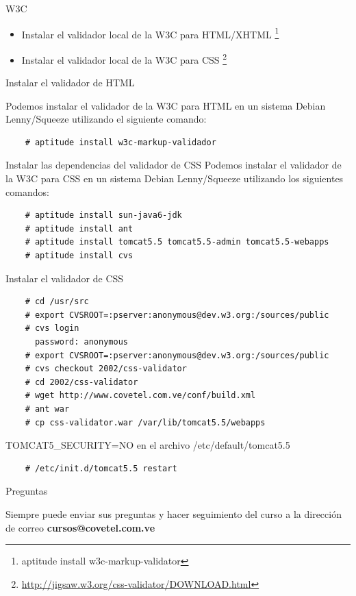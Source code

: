 \documentclass{beamer}
\begin{document}
\begin{frame}{W3C} %
    \begin{center}
    \begin{itemize}
        \item Instalar el validador local de la W3C para HTML/XHTML
        \footnote{aptitude install w3c-markup-validator} 
        \item Instalar el validador local de la W3C para CSS \footnote{\url{http://jigsaw.w3.org/css-validator/DOWNLOAD.html}}
    \end{itemize}
    \end{center}
\end{frame}

\begin{frame}[fragile]{Instalar el validador de HTML} %
    \begin{center}
    Podemos instalar el validador de la W3C para HTML en un sistema Debian
    Lenny/Squeeze utilizando el siguiente comando:
    \begin{verbatim}
    # aptitude install w3c-markup-validador
    \end{verbatim}
    \end{center}
\end{frame}

\begin{frame}[fragile]{Instalar las dependencias del validador de CSS} %
    Podemos instalar el validador de la W3C para CSS en un sistema Debian
    Lenny/Squeeze utilizando los siguientes comandos:
    {\footnotesize
    \begin{verbatim}
    # aptitude install sun-java6-jdk 
    # aptitude install ant 
    # aptitude install tomcat5.5 tomcat5.5-admin tomcat5.5-webapps
    # aptitude install cvs 
    \end{verbatim}
    }
\end{frame} 

\begin{frame}[fragile]{Instalar el validador de CSS} %

    {\footnotesize 
    \begin{verbatim}
    # cd /usr/src 
    # export CVSROOT=:pserver:anonymous@dev.w3.org:/sources/public 
    # cvs login 
      password: anonymous
    # export CVSROOT=:pserver:anonymous@dev.w3.org:/sources/public 
    # cvs checkout 2002/css-validator
    # cd 2002/css-validator 
    # wget http://www.covetel.com.ve/conf/build.xml
    # ant war 
    # cp css-validator.war /var/lib/tomcat5.5/webapps 
    \end{verbatim}
    }
    TOMCAT5\_SECURITY=NO en el archivo /etc/default/tomcat5.5\\[0.5cm]

    \begin{verbatim}
    # /etc/init.d/tomcat5.5 restart
    \end{verbatim}

\end{frame}

\begin{frame}{Preguntas} %
    \begin{center}
    Siempre puede enviar sus preguntas y hacer seguimiento del curso a la
    dirección de correo {\bfseries cursos@covetel.com.ve}
    \end{center}
\end{frame}
\end{document}
